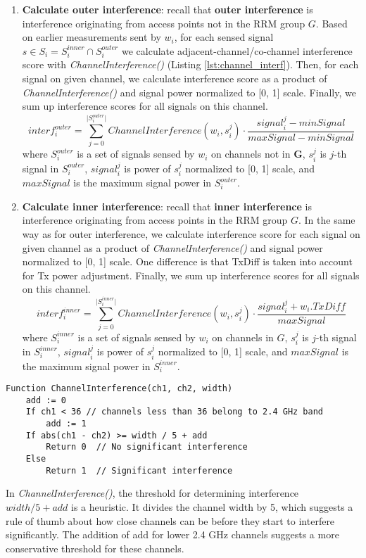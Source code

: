 \begin{enumerate}
    \item \textbf{Calculate outer interference}: recall that \textbf{outer interference} is interference originating from access points not in the RRM group $G$.
    Based on earlier measurements sent by $w_i$, for each sensed signal $s \in S_i = S^{inner}_i \cap S^{outer}_i$ we calculate adjacent-channel/co-channel interference score with \textit{ChannelInterference()} (Listing \ref{lst:channel_interf}). Then, for each signal on given channel, we calculate interference score as a product of \textit{ChannelInterference()} and signal power normalized to [0, 1] scale. Finally, we sum up interference scores for all signals on this channel.
    \begin{equation}
        interf^{outer}_i = \sum_{j=0}^{\lvert S^{outer}_i \rvert} ChannelInterference(w_i, s^j_i) \cdot \frac{signal^j_i - minSignal}{maxSignal - minSignal}
    \end{equation}
    where $S^{outer}_i$ is a set of signals sensed by $w_i$ on channels not in $\mathbf{G}$, $s^j_i$ is $j$-th signal in $S^{outer}_i$, $signal^j_i$ is power of $s^j_i$ normalized to [0, 1] scale, and $maxSignal$ is the maximum signal power in $S^{outer}_i$.
    \item \textbf{Calculate inner interference}: recall that \textbf{inner interference} is interference originating from access points in the RRM group $G$. In the same way as for outer interference, we calculate interference score for each signal on given channel as a product of \textit{ChannelInterference()} and signal power normalized to [0, 1] scale. One difference is that TxDiff is taken into account for Tx power adjustment. Finally, we sum up interference scores for all signals on this channel.
    \begin{equation}
        interf^{inner}_i = \sum_{j=0}^{\lvert S^{inner}_i \rvert} ChannelInterference(w_i, s^j_i) \cdot \frac{signal^j_i + w_i.TxDiff}{maxSignal}
    \end{equation}
    where $S^{inner}_i$ is a set of signals sensed by $w_i$ on channels in $G$, $s^j_i$ is $j$-th signal in $S^{inner}_i$, $signal^j_i$ is power of $s^j_i$ normalized to [0, 1] scale, and $maxSignal$ is the maximum signal power in $S^{inner}_i$.
\end{enumerate}

\begin{lstlisting}[language={Pseudo}, caption=ChannelInterference() function, label=lst:channel_interf]
Function ChannelInterference(ch1, ch2, width)
    add := 0
    If ch1 < 36 // channels less than 36 belong to 2.4 GHz band
        add := 1
    If abs(ch1 - ch2) >= width / 5 + add
        Return 0  // No significant interference
    Else
        Return 1  // Significant interference
\end{lstlisting}
In \textit{ChannelInterference()}, the threshold for determining interference $width/5+add$ is a heuristic. It divides the channel width by 5, which suggests a rule of thumb about how close channels can be before they start to interfere significantly. The addition of add for lower 2.4 GHz channels suggests a more conservative threshold for these channels.

